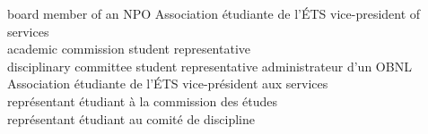 \documentclass[print]{friggeri-cv}
\begin{document}
\begin{entrylist}
  \engfr
  { {board member of an {\small NPO}} {Association étudiante de l'{\scriptsize ÉTS}} {vice-president of services\\ academic commission student representative \\ disciplinary committee student representative}}
  { {administrateur d'un {\small OBNL}} {Association étudiante de l'{\scriptsize ÉTS}} {vice-président aux services\\représentant étudiant à la commission des études\\représentant étudiant au comité de discipline}}
\end{entrylist}
\newpage
\end{document}
